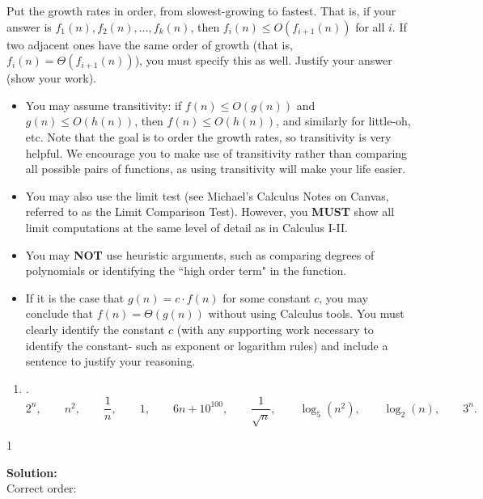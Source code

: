 \documentclass[9pt]{article}
\def\solutions{1}
\begin{document}
\item 
Put the growth rates in order, from slowest-growing to fastest. That is, if your answer is $f_1(n), f_2(n), \dotsc, f_k(n)$, then $f_i(n) \leq O(f_{i+1}(n))$ for all $i$. If two adjacent ones have the same order of growth (that is, $f_i(n) = \Theta(f_{i+1}(n))$), you must specify this as well. Justify your answer (show your work). 
\begin{itemize}
\item You may assume transitivity: if $f(n) \leq O(g(n))$ and $g(n) \leq O(h(n))$, then $f(n) \leq O(h(n))$, and similarly for little-oh, etc. Note that the goal is to order the growth rates, so transitivity is very helpful. We encourage you to make use of transitivity rather than comparing all possible pairs of functions, as using transitivity will make your life easier.

\item You may also use the limit test (see Michael's Calculus Notes on Canvas, referred to as the Limit Comparison Test). However, you \textbf{MUST} show all limit computations at the same level of detail as in Calculus I-II.
\item You may \textbf{NOT} use heuristic arguments, such as comparing degrees of polynomials or identifying the ``high order term" in the function.
\item If it is the case that $g(n) = c \cdot f(n)$ for some constant $c$, you may conclude that $f(n) = \Theta(g(n))$ without using Calculus tools. You must clearly identify the constant $c$ (with any supporting work necessary to identify the constant- such as exponent or logarithm rules) and include a sentence to justify your reasoning. 
\end{itemize}


\begin{enumerate}
\item \label{2a} {\itshape.
\[
2^n, \qquad 
n^2, \qquad
\frac{1}{n}, \qquad
1, \qquad
6n+10^{100}, \qquad
\frac{1}{\sqrt{n}}, \qquad
\log_5(n^2), \qquad
\log_2(n), \qquad
3^n.
\]
}

\end{enumerate}

\if\solutions1
\vspace{2mm}

\textbf{Solution:} \\
Correct order:
\end{document}
